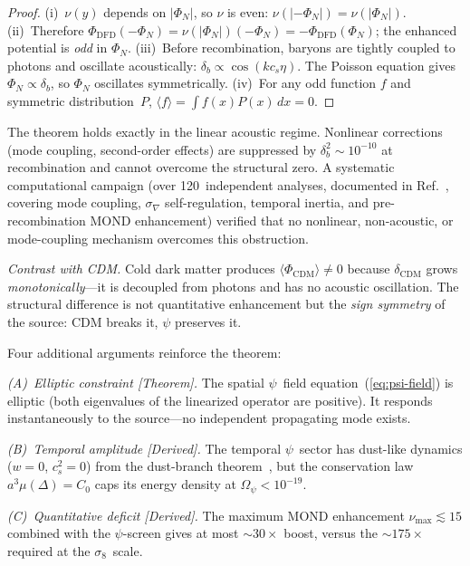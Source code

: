 \documentclass[aps,prd,twocolumn,superscriptaddress,showpacs,floatfix,nofootinbib]{revtex4-2}
\theoremstyle{definition}
\theoremstyle{remark}
\newcommand{\grade}[1]{\textsf{\footnotesize [#1]}}
\begin{document}
\begin{proof}
(i)~$\nu(y)$ depends on $|\Phi_N|$, so $\nu$ is even:
$\nu(|-\Phi_N|) = \nu(|\Phi_N|)$.
(ii)~Therefore $\Phi_{\mathrm{DFD}}(-\Phi_N)
= \nu(|\Phi_N|)(-\Phi_N) = -\Phi_{\mathrm{DFD}}(\Phi_N)$;
the enhanced potential is \emph{odd} in $\Phi_N$.
(iii)~Before recombination, baryons are tightly coupled to
photons and oscillate acoustically:
$\delta_b\propto\cos(kc_s\eta)$. The Poisson equation gives
$\Phi_N\propto\delta_b$, so $\Phi_N$ oscillates symmetrically.
(iv)~For any odd function $f$ and symmetric distribution~$P$,
$\langle f\rangle = \int f(x)P(x)\,dx = 0$.
\end{proof}

The theorem holds exactly in the linear acoustic regime.
Nonlinear corrections (mode coupling, second-order effects)
are suppressed by $\delta_b^2\sim 10^{-10}$ at
recombination and cannot overcome the structural zero.
A systematic computational campaign (over 120~independent
analyses, documented in
Ref.~\cite{Alcock2025_supp}, covering mode coupling,
$\sigma_\nabla$ self-regulation, temporal inertia, and
pre-recombination MOND enhancement) verified that no
nonlinear, non-acoustic, or mode-coupling mechanism
overcomes this obstruction.

\emph{Contrast with CDM.} Cold dark matter produces
$\langle\Phi_{\mathrm{CDM}}\rangle\neq 0$ because
$\delta_{\mathrm{CDM}}$ grows \emph{monotonically}---it is
decoupled from photons and has no acoustic oscillation.
The structural difference is not quantitative enhancement
but the \emph{sign symmetry} of the source: CDM breaks
it, $\psi$ preserves it.

Four additional arguments reinforce the theorem:

\emph{(A)~Elliptic constraint \grade{Theorem}.} The spatial
$\psi$~field equation~(\ref{eq:psi-field}) is elliptic
(both eigenvalues of the linearized operator are positive).
It responds instantaneously to the source---no independent
propagating mode exists.

\emph{(B)~Temporal amplitude \grade{Derived}.} The temporal
$\psi$~sector has dust-like dynamics ($w=0$, $c_s^2=0$)
from the dust-branch theorem~\cite{Alcock2025}, but the
conservation law $a^3\mu(\Delta)=C_0$ caps its energy
density at $\Omega_\psi < 10^{-19}$.

\emph{(C)~Quantitative deficit \grade{Derived}.} The
maximum MOND enhancement $\nu_{\max}\lesssim 15$ combined
with the $\psi$-screen gives at most ${\sim}30\times$
boost, versus the ${\sim}175\times$ required at the
$\sigma_8$~scale.
\end{document}
